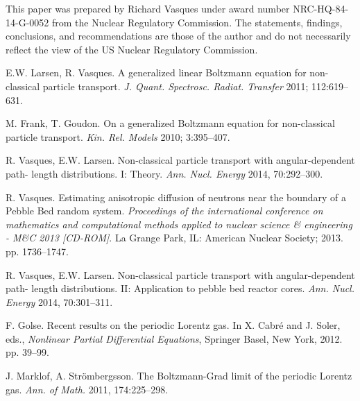 \documentclass[preprint,12pt]{elsarticle}
\begin{document}
This paper was prepared by Richard Vasques under award number NRC-HQ-84-14-G-0052 from the Nuclear Regulatory Commission. The statements, findings, conclusions, and recommendations are those of the author and do not necessarily reflect the view of the US Nuclear Regulatory Commission.

\begin{thebibliography}{00}

\begin{small}

E.W. Larsen, R. Vasques. A generalized linear Boltzmann equation for non-classical particle transport. \textit{J. Quant. Spectrosc. Radiat. Transfer} 2011; 112:619--631.\vspace{-8pt}

M. Frank, T. Goudon. On a generalized Boltzmann equation for non-classical particle transport. \textit{Kin. Rel. Models} 2010; 3:395--407.\vspace{-8pt}

R. Vasques, E.W. Larsen. Non-classical particle transport with angular-dependent path- length distributions. I: Theory. \textit{Ann. Nucl. Energy} 2014, 70:292--300.\vspace{-8pt}

R. Vasques. Estimating anisotropic diffusion of neutrons near the boundary of a Pebble Bed random system. \textit{Proceedings of the international conference on mathematics and computational methods applied to nuclear science \& engineering - M\&C 2013 [CD-ROM]}. La Grange Park, IL: American Nuclear Society; 2013. pp. 1736--1747.\vspace{-8pt}

R. Vasques, E.W. Larsen. Non-classical particle transport with angular-dependent path- length distributions. II: Application to pebble bed reactor cores. \textit{Ann. Nucl. Energy} 2014, 70:301--311.\vspace{-8pt}

F. Golse. Recent results on the periodic Lorentz gas. In X. Cabr\' e and J. Soler, eds., \textit{Nonlinear
Partial Differential Equations}, Springer Basel, New York, 2012. pp. 39--99.\vspace{-8pt}

J. Marklof, A. Str\" ombergsson. The Boltzmann-Grad limit of the periodic Lorentz gas.
\textit{Ann. of Math.} 2011, 174:225--298.\vspace{-8pt}


\end{small}
\end{thebibliography}
\end{document}
